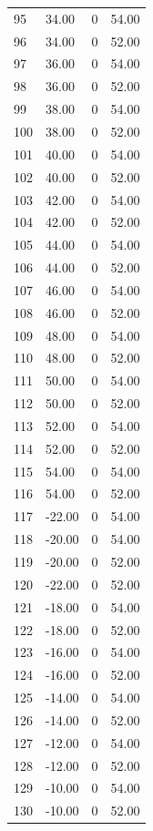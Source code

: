 \documentclass[a4paper,11pt]{article}
\begin{document}
\begin{center}
\begin{longtable}{|R{1.5cm}|R{2.4cm}|R{2.4cm}|R{2.4cm}|}
   95 &  34.00  & 0  &  54.00 \\ 
   96 &  34.00  & 0  &  52.00 \\ 
   97 &  36.00  & 0  &  54.00 \\ 
   98 &  36.00  & 0  &  52.00 \\ 
   99 &  38.00  & 0  &  54.00 \\ 
  100 &  38.00  & 0  &  52.00 \\ 
  101 &  40.00  & 0  &  54.00 \\ 
  102 &  40.00  & 0  &  52.00 \\ 
  103 &  42.00  & 0  &  54.00 \\ 
  104 &  42.00  & 0  &  52.00 \\ 
  105 &  44.00  & 0  &  54.00 \\ 
  106 &  44.00  & 0  &  52.00 \\ 
  107 &  46.00  & 0  &  54.00 \\ 
  108 &  46.00  & 0  &  52.00 \\ 
  109 &  48.00  & 0  &  54.00 \\ 
  110 &  48.00  & 0  &  52.00 \\ 
  111 &  50.00  & 0  &  54.00 \\ 
  112 &  50.00  & 0  &  52.00 \\ 
  113 &  52.00  & 0  &  54.00 \\ 
  114 &  52.00  & 0  &  52.00 \\ 
  115 &  54.00  & 0  &  54.00 \\ 
  116 &  54.00  & 0  &  52.00 \\ 
  117 & -22.00  & 0  &  54.00 \\ 
  118 & -20.00  & 0  &  54.00 \\ 
  119 & -20.00  & 0  &  52.00 \\ 
  120 & -22.00  & 0  &  52.00 \\ 
  121 & -18.00  & 0  &  54.00 \\ 
  122 & -18.00  & 0  &  52.00 \\ 
  123 & -16.00  & 0  &  54.00 \\ 
  124 & -16.00  & 0  &  52.00 \\ 
  125 & -14.00  & 0  &  54.00 \\ 
  126 & -14.00  & 0  &  52.00 \\ 
  127 & -12.00  & 0  &  54.00 \\ 
  128 & -12.00  & 0  &  52.00 \\ 
  129 & -10.00  & 0  &  54.00 \\ 
  130 & -10.00  & 0  &  52.00 \\ 

\end{longtable}
\end{center}
\end{document}
